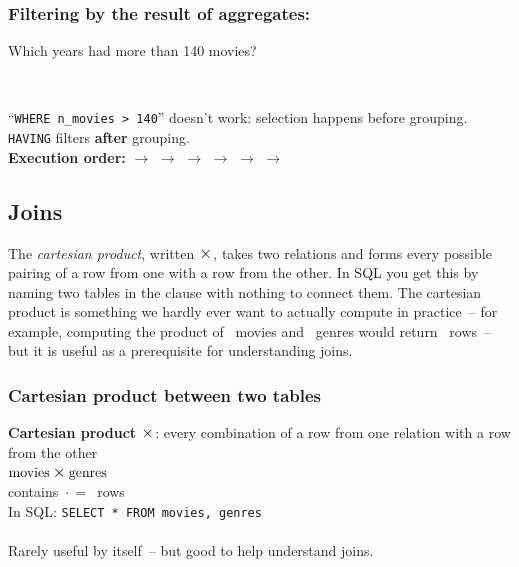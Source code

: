 \begin{frame}
    \label{s:having}
    \frametitle{Filtering by the result of aggregates: }
    Which years had more than 140 movies?
    \inputminted[fontsize=\footnotesize]{sql}{code/sql-having.sql}
    \vspace{0.3em}
    {\footnotesize}\\[0.8em]
    ``\texttt{WHERE n_movies > 140}'' doesn't work: selection happens before grouping.
    \texttt{HAVING} filters \textbf{after} grouping.\\[1em]\pause
    \textbf{Execution order:}  $\rightarrow$  $\rightarrow$  $\rightarrow$  $\rightarrow$  $\rightarrow$  $\rightarrow$ 
\end{frame}
\label{l:having}



\subsection{Joins}

The \emph{cartesian product}, written $\rabin{\times}$, takes two relations and forms every possible pairing of a row from one with a row from the other.
In SQL you get this by naming two tables in the  clause with nothing to connect them.
The cartesian product is something we hardly ever want to actually compute in practice~-- for example, computing the product of \dbrowsmovies\ movies and \dbrowsgenres\ genres would return \dbrowsmoviesgenres\ rows~-- but it is useful as a prerequisite for understanding joins.

\begin{frame}
    \label{s:product}
    \frametitle{Cartesian product between two tables}
    \textbf{Cartesian product} $\rabin{\times}$:
    every combination of a row from one relation with a row from the other\\[0.3em]
    \hspace*{1em}$\ra{movies} \rabin{\times} \ra{genres}$\\[0.6em]
    contains \dbrowsmovies${}\cdot{}$\dbrowsgenres${}={}$\dbrowsmoviesgenres\ rows\\[0.4em]\pause
    In SQL: \texttt{SELECT * FROM movies, genres}\\[0.6em]
    {\scriptsize}\\[0.6em]
    Rarely useful by itself~-- but good to help understand joins.
\end{frame}
\label{l:product}

